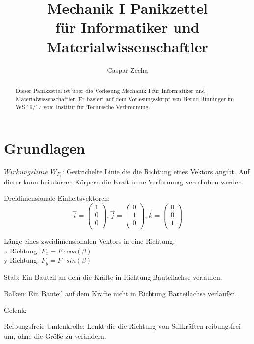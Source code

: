 \documentclass[a4paper,parskip=half*,DIV=7,fontsize=11pt]{scrartcl}
\title{Mechanik I Panikzettel \\ \Large für Informatiker und Materialwissenschaftler}
\author{Caspar Zecha}
\begin{document}
\maketitle

\begin{abstract}
	Dieser Panikzettel ist über die Vorlesung Mechanik I für Informatiker und Materialwissenschaftler. Er basiert auf dem Vorlesungsskript von Bernd Binninger im WS 16/17 vom Institut für Technische Verbrennung.
\end{abstract}

\tableofcontents

\pagebreak

\section{Grundlagen}
$\textit{Wirkungslinie}$ $W_{F_1}$: Gestrichelte Linie die die Richtung eines Vektors angibt. Auf dieser kann bei starren Körpern die Kraft ohne Verformung verschoben werden.

Dreidimensionale Einheitsvektoren: $$\overrightarrow{i}=\begin{pmatrix}
1\\
0\\
0\\
\end{pmatrix},\overrightarrow{j}=\begin{pmatrix}
0\\
1\\
0\\
\end{pmatrix},\overrightarrow{k}=\begin{pmatrix}
0\\
0\\
1\\
\end{pmatrix}$$

Länge eines zweidimensionalen Vektors in eine Richtung:\\
x-Richtung: $F_x=F \cdot cos(\beta)$\\
y-Richtung: $F_y=F \cdot sin(\beta)$

Stab: Ein Bauteil an dem die Kräfte in Richtung Bauteilachse verlaufen.

Balken: Ein Bauteil auf dem Kräfte nicht in Richtung Bauteilachse verlaufen.

Gelenk:

Reibungsfreie Umlenkrolle: Lenkt die die Richtung von Seilkräften reibungsfrei um, ohne die Größe zu verändern.
\end{document}
